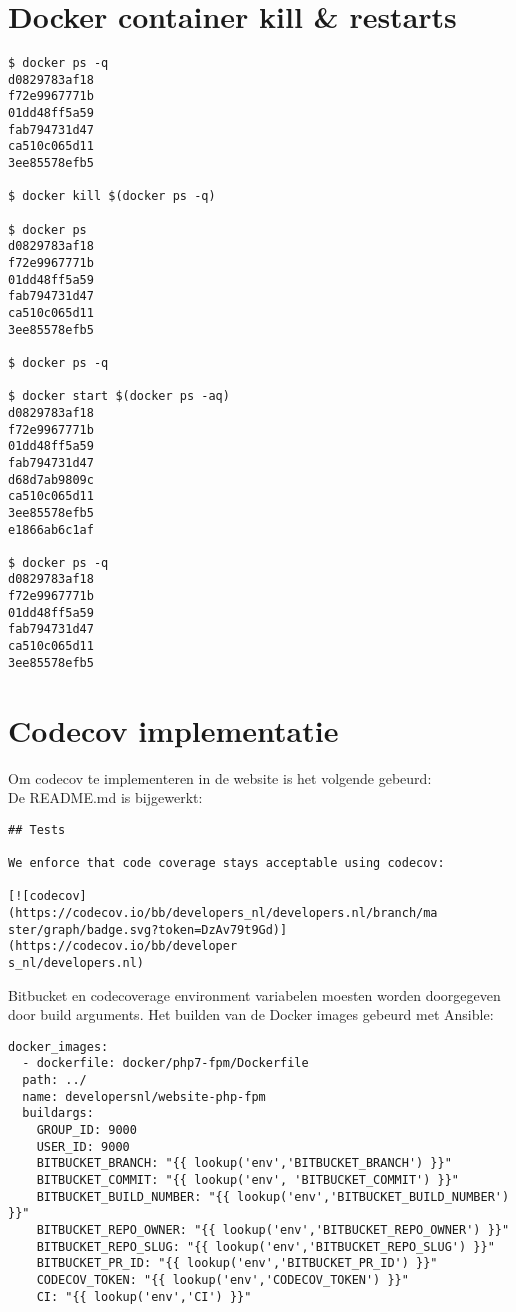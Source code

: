\section{Docker container kill \& restarts}

\label{DockerKills}

\begin{verbatim}
$ docker ps -q
d0829783af18
f72e9967771b
01dd48ff5a59
fab794731d47
ca510c065d11
3ee85578efb5

$ docker kill $(docker ps -q) 

$ docker ps
d0829783af18
f72e9967771b
01dd48ff5a59
fab794731d47
ca510c065d11
3ee85578efb5

$ docker ps -q

$ docker start $(docker ps -aq)
d0829783af18
f72e9967771b
01dd48ff5a59
fab794731d47
d68d7ab9809c
ca510c065d11
3ee85578efb5
e1866ab6c1af

$ docker ps -q
d0829783af18
f72e9967771b
01dd48ff5a59
fab794731d47
ca510c065d11
3ee85578efb5
\end{verbatim}

\section{Codecov implementatie} \label{codecov}
Om codecov te implementeren in de website is het volgende gebeurd:\\
De README.md is bijgewerkt:
\begin{verbatim}
## Tests

We enforce that code coverage stays acceptable using codecov:

[![codecov](https://codecov.io/bb/developers_nl/developers.nl/branch/ma
ster/graph/badge.svg?token=DzAv79t9Gd)](https://codecov.io/bb/developer
s_nl/developers.nl)
\end{verbatim}

Bitbucket en codecoverage environment variabelen moesten worden doorgegeven door build arguments. Het builden van de Docker images gebeurd met Ansible:
\begin{verbatim}
docker_images:
  - dockerfile: docker/php7-fpm/Dockerfile
  path: ../
  name: developersnl/website-php-fpm
  buildargs:
    GROUP_ID: 9000
    USER_ID: 9000
    BITBUCKET_BRANCH: "{{ lookup('env','BITBUCKET_BRANCH') }}"
    BITBUCKET_COMMIT: "{{ lookup('env', 'BITBUCKET_COMMIT') }}"
    BITBUCKET_BUILD_NUMBER: "{{ lookup('env','BITBUCKET_BUILD_NUMBER') }}"
    BITBUCKET_REPO_OWNER: "{{ lookup('env','BITBUCKET_REPO_OWNER') }}"
    BITBUCKET_REPO_SLUG: "{{ lookup('env','BITBUCKET_REPO_SLUG') }}"
    BITBUCKET_PR_ID: "{{ lookup('env','BITBUCKET_PR_ID') }}"
    CODECOV_TOKEN: "{{ lookup('env','CODECOV_TOKEN') }}"
    CI: "{{ lookup('env','CI') }}"
\end{verbatim}

